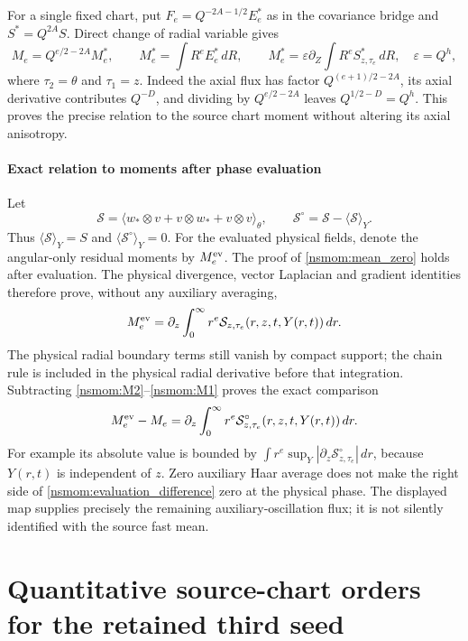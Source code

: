 \documentclass[11pt]{article}
\begin{document}
For a single fixed chart, put
$F_e=Q^{-2A-1/2}E_e^*$ as in the covariance bridge and
$S^*=Q^{2A}S$. Direct change of radial variable gives
\[
 M_e=Q^{e/2-2A}M_e^*,\qquad
 M_e^*=\int R^eE_e^*\,dR,
 \qquad
 M_e^*=\varepsilon\partial_Z\int R^e S^*_{z,\tau_e}\,dR,
 \quad\varepsilon=Q^h,
\]
where $\tau_2=\theta$ and $\tau_1=z$. Indeed the axial flux has
factor $Q^{(e+1)/2-2A}$, its axial derivative contributes $Q^{-D}$,
and dividing by $Q^{e/2-2A}$ leaves $Q^{1/2-D}=Q^h$.
This proves the precise relation to the source chart moment without
altering its axial anisotropy.

\subsection{Exact relation to moments after phase evaluation}
\label{nsmom:evaluated}
Let
\[
 \mathcal S=\langle w_*\otimes v+v\otimes w_*+v\otimes v\rangle_\theta,
 \qquad \mathcal S^\circ=\mathcal S-\langle\mathcal S\rangle_Y.
\]
Thus $\langle\mathcal S\rangle_Y=S$ and
$\langle\mathcal S^\circ\rangle_Y=0$. For the evaluated physical
fields, denote the angular-only residual moments by $M_e^{\rm ev}$.
The proof of \eqref{nsmom:mean_zero} holds after evaluation. The
physical divergence, vector Laplacian and gradient identities therefore
prove, without any auxiliary averaging,
\[
 M_e^{\rm ev}
   =\partial_z\int_0^\infty r^e
        \mathcal S_{z,\tau_e}(r,z,t,Y(r,t))\,dr.
\]
The physical radial boundary terms still vanish by compact support;
the chain rule is included in the physical radial derivative before
that integration. Subtracting \eqref{nsmom:M2}--\eqref{nsmom:M1} proves
the exact comparison
\begin{equation}
 M_e^{\rm ev}-M_e
 =\partial_z\int_0^\infty r^e
     \mathcal S^\circ_{z,\tau_e}(r,z,t,Y(r,t))\,dr.
 \label{nsmom:evaluation_difference}
\end{equation}
For example its absolute value is bounded by
$\int r^e\sup_Y|\partial_z\mathcal S^\circ_{z,\tau_e}|\,dr$,
because $Y(r,t)$ is independent of $z$. Zero auxiliary Haar average
does not make the right side of \eqref{nsmom:evaluation_difference}
zero at the physical phase. The displayed map supplies precisely the
remaining auxiliary-oscillation flux; it is not silently identified
with the source fast mean.
\clearpage\part{Quantitative source-chart orders for the retained third seed}
\end{document}
